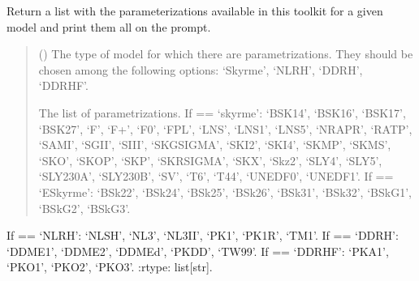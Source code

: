 \documentclass[letterpaper,10pt,english]{sphinxmanual}
\begin{document}

\begin{fulllineitems}
\label{\detokenize{source/api/setup_eos_pheno_esym:nucleardatapy.eos.setup_pheno_esym.pheno_esym_params}}
\pysigstartsignatures
{}
\pysigstopsignatures
\sphinxAtStartPar
Return a list with the parameterizations available in
this toolkit for a given model and print them all on the prompt.
\begin{quote}\begin{description}
\sphinxAtStartPar
{} () \textendash{} The type of model for which there are parametrizations.     They should be chosen among the following options: ‘Skyrme’, ‘NLRH’,     ‘DDRH’, ‘DDRHF’.

\sphinxAtStartPar
The list of parametrizations.     If  == ‘skyrme’: ‘BSK14’,     ‘BSK16’, ‘BSK17’, ‘BSK27’, ‘F\sphinxhyphen{}’, ‘F+’, ‘F0’, ‘FPL’, ‘LNS’, ‘LNS1’, ‘LNS5’,     ‘NRAPR’, ‘RATP’, ‘SAMI’, ‘SGII’, ‘SIII’, ‘SKGSIGMA’, ‘SKI2’, ‘SKI4’, ‘SKMP’,     ‘SKMS’, ‘SKO’, ‘SKOP’, ‘SKP’, ‘SKRSIGMA’, ‘SKX’, ‘Skz2’, ‘SLY4’, ‘SLY5’,     ‘SLY230A’, ‘SLY230B’, ‘SV’, ‘T6’, ‘T44’, ‘UNEDF0’, ‘UNEDF1’.     If  == ‘ESkyrme’: ‘BSk22’, ‘BSk24’, ‘BSk25’, ‘BSk26’, ‘BSk31’, ‘BSk32’,     ‘BSkG1’, ‘BSkG2’, ‘BSkG3’.

\end{description}\end{quote}

\sphinxAtStartPar
If  == ‘NLRH’: ‘NL\sphinxhyphen{}SH’, ‘NL3’, ‘NL3II’, ‘PK1’, ‘PK1R’, ‘TM1’.     If  == ‘DDRH’: ‘DDME1’, ‘DDME2’, ‘DDMEd’, ‘PKDD’, ‘TW99’.     If  == ‘DDRHF’: ‘PKA1’, ‘PKO1’, ‘PKO2’, ‘PKO3’.
:rtype: list{[}str{]}.

\end{fulllineitems}

\end{document}
